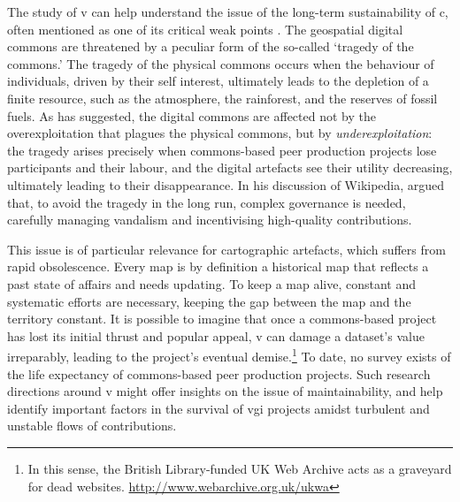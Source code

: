 \documentclass{article} \usepackage{graphicx,xspace}
\begin{document}
The study of \gls{v} can help understand the issue of the long-term sustainability of \gls{c}, often mentioned as one of its critical weak points \citep{dodge:2013:mappingexp}.
The geospatial digital commons are threatened by a peculiar form of the so-called `tragedy of the commons.'
The tragedy of the physical commons occurs when the behaviour of individuals, driven by their self interest, ultimately leads to the depletion of a finite resource, such as the atmosphere, the rainforest, and the reserves of fossil fuels.
As \cite{jayaraman:2012:tragedy} has suggested, the digital commons are affected not by the overexploitation that plagues the physical commons, but by \emph{underexploitation}:
the tragedy arises precisely when commons-based peer production projects lose participants and their labour, and the digital artefacts see their utility decreasing, ultimately leading to their disappearance. 
In his discussion of Wikipedia, \cite{george:2007:tragedywikicommons} argued that,  to avoid the tragedy in the long run, complex governance is needed, carefully managing vandalism and incentivising high-quality contributions.
 
This issue is of particular relevance for cartographic artefacts, which suffers from rapid obsolescence.
Every map is by definition a historical map that reflects a past state of affairs and needs updating.
To keep a map alive, constant and systematic efforts are necessary, keeping the gap between the map and the territory constant.   
It is possible to imagine that once a commons-based  project has lost its initial thrust and popular appeal, \gls{v} can damage a dataset's value irreparably, leading to the project's eventual demise.\footnote{In this sense, the British Library-funded UK Web Archive acts as a graveyard for dead websites. \url{http://www.webarchive.org.uk/ukwa}}
To date, no survey exists of the life expectancy of commons-based peer production projects.
Such research directions around \gls{v} might offer insights on the issue of maintainability, and help identify important factors in the survival of
\gls{vgi} projects amidst turbulent and unstable flows of contributions.







 
 
\end{document}
